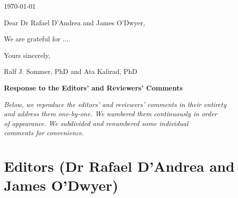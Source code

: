 \documentclass[letterpaper,11pt]{article}
\begin{document}
\begin{flushright}
\today
\end{flushright}

\bigskip

\noindent
Dear Dr Rafael D'Andrea and James O'Dwyer,

We are grateful for .... 

\bigskip

\noindent
Yours sincerely,

\bigskip

\noindent
Ralf J. Sommer, PhD and Ata Kalirad, PhD

\newpage

\begin{center}
\LARGE \bf
Response to the Editors' and Reviewers' Comments
\end{center}

\smallskip

\begin{center}
  \emph{Below, we reproduce the editors' and reviewers' comments in their entirety \\ and 
  address them one-by-one.  We numbered them continuously in order \\ of appearance.
  We subdivided and renumbered some individual \\ comments for convenience.}
  \end{center}

\section*{Editors (Dr Rafael D'Andrea and James O'Dwyer)}
\end{document}
